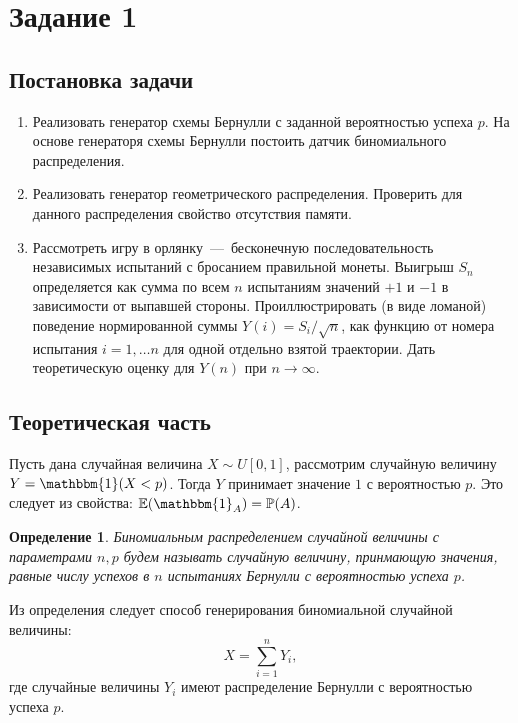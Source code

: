 \documentclass[12pt, a4paper]{article} %
\def\Pro{\mathbb{P}} %
\def\Expec{\mathbb{E}} %
\def\Ind{\mathbbm{1}} %
\newtheorem{Def}{Определение}
\begin{document}


\newpage

\tableofcontents

\newpage

\section{Задание 1}

\subsection{Постановка задачи}

\begin{enumerate}
    \item Реализовать генератор схемы Бернулли с заданной вероятностью успеха $p$.
        На основе генераторя схемы Бернулли постоить  датчик биномиального распределения.
    \item Реализовать генератор геометрического распределения. 
        Проверить для данного распределения свойство отсутствия памяти.
    \item Рассмотреть игру в орлянку~---~бесконечную последовательность независимых испытаний с бросанием правильной монеты.
        Выигрыш $S_n$ определяется как сумма по всем  $n$ испытаниям значений  $+1$ и $-1$ в зависимости от выпавшей стороны. 
        Проиллюстрировать (в виде ломаной) поведение нормированной суммы 
        $Y(i) = S_i / \sqrt n$, как функцию от номера испытания  $i=1,\ldots n$ для одной отдельно взятой траектории. 
        Дать теоретическую оценку для $Y(n)$ при  $n \rightarrow \infty$.
\end{enumerate} 

\subsection{Теоретическая часть}

Пусть дана случайная величина $X \sim U[0, 1]$, рассмотрим случайную величину $Y = \Ind(X < p)$. 
Тогда $Y$ принимает значение $1$ с вероятностью $p$.
Это следует из свойства: $\Expec(\Ind_A) = \Pro(A)$.

\begin{Def}
    Биномиальным распределением случайной величины с параметрами $n, p$ 
    будем называть случайную величину, принмающую значения, равные числу успехов в  $n$ испытаниях Бернулли с вероятностью успеха $p$.
\end{Def}
Из определения следует способ генерирования биномиальной случайной величины:
\[
    X = \sum\limits_{i=1}^{n} Y_i, 
\] 
где случайные величины $Y_i$ имеют распределение Бернулли с вероятностью успеха  $p$.
\end{document}
